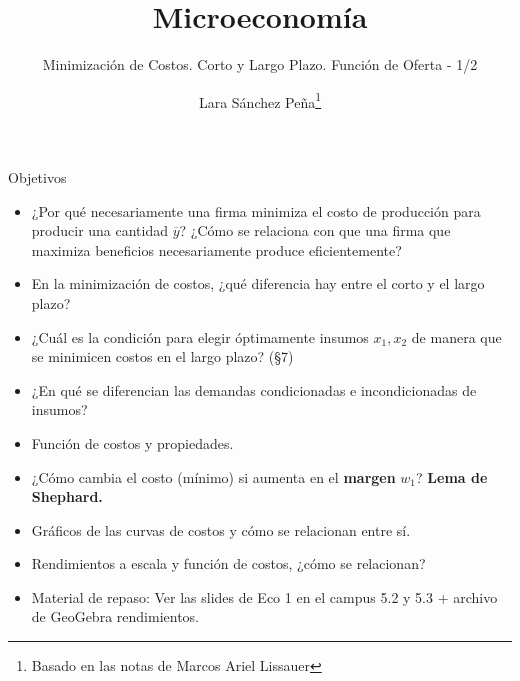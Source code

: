 \documentclass{beamer}
\title{Microeconom\'ia}
\subtitle{Minimizaci\'on de Costos. Corto y Largo Plazo. Funci\'on de Oferta - 1/2\\ \mydate}
\author[Minimización costos 1/2]{Lara Sánchez Peña\footnote{Basado en las notas de Marcos Ariel Lissauer}}
\institute[]{UTDT}
\date[UTDT 2023]{}
\theoremstyle{definition}
\begin{document}
\begin{frame}
  \titlepage
\end{frame}

\begin{frame}{Objetivos}
\begin{itemize}\small
    \item  ¿Por qué necesariamente una firma minimiza el costo de producción para producir una cantidad $\overline{y}$? ¿Cómo se relaciona con que una firma que maximiza beneficios necesariamente produce eficientemente?
    
    \item  En la minimización de costos, ¿qué diferencia hay entre el corto y el largo plazo?
    \item ¿Cuál es la condición para elegir óptimamente insumos $x_1, x_2$ de manera que se minimicen costos en el largo plazo? (\S 7)
    \item ¿En qué se diferencian las demandas condicionadas e incondicionadas de insumos?
    \item Función de costos y propiedades.
    \item ¿Cómo cambia el costo (m\'inimo) si aumenta en el \textbf{margen} $w_1$? \textbf{Lema de Shephard.}
    \item Gráficos de las curvas de costos y cómo se relacionan entre sí.
    \item Rendimientos a escala y función de costos, ¿cómo se relacionan?
    \item Material de repaso: Ver las slides de Eco 1 en el campus 5.2 y 5.3 + archivo de GeoGebra rendimientos.
\end{itemize}
    
\end{frame}
\end{document}
